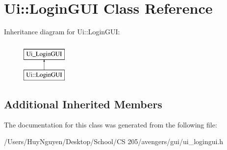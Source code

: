 \hypertarget{classUi_1_1LoginGUI}{}\section{Ui\+:\+:Login\+G\+UI Class Reference}
\label{classUi_1_1LoginGUI}
Inheritance diagram for Ui\+:\+:Login\+G\+UI\+:\begin{figure}[H]
\begin{center}
\leavevmode
\includegraphics[height=2.000000cm]{classUi_1_1LoginGUI}
\end{center}
\end{figure}
\subsection*{Additional Inherited Members}


The documentation for this class was generated from the following file\+:\begin{DoxyCompactItemize}
\item 
/\+Users/\+Huy\+Nguyen/\+Desktop/\+School/\+C\+S 205/avengers/gui/ui\+\_\+logingui.\+h\end{DoxyCompactItemize}
